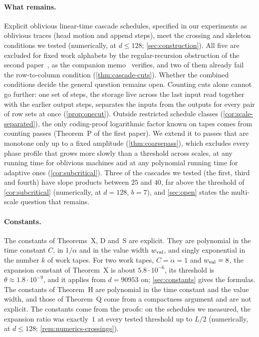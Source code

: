 \paragraph{What remains.} Explicit oblivious linear-time cascade schedules, specified in our experiments as oblivious traces (head motion
and append steps), meet the crossing and skeleton conditions we tested (numerically, at $d\le128$; \cref{sec:construction}). All five are
excluded for fixed work alphabets by the regular-recursion obstruction of the second paper~\cite[Theorem~7.5]{SecondPaper2026}, as the
companion memo~\cite[Theorem~1.1]{CascadeObstructionMemo2026} verifies, and two of them already fail the row-to-column condition
(\cref{thm:cascade-cuts}). Whether the combined conditions decide the general question remains open. Counting cuts alone cannot go further: one set of steps, the storage live across the last input read
together with the earlier output steps, separates the inputs from the outputs for every pair of row sets at once (\cref{prop:onecut}).
Outside restricted schedule classes (\cref{cor:scale-separated}), the only coding-proof logarithmic factor known on tapes comes from counting
passes (Theorem~P of the first paper). We extend it to passes that are monotone only up to a fixed amplitude (\cref{thm:coarsepass}), which
excludes every phase profile that grows more slowly than a threshold across scales, at any running time for oblivious machines and at any
polynomial running time for adaptive ones (\cref{cor:subcritical}). Three of the cascades we tested (the first, third and fourth) have slope
products between $25$ and $40$, far above the threshold of \cref{cor:subcritical} (numerically, at $d=128$, $b=7$), and
\cref{sec:open} states the multi-scale question that remains.

\paragraph{Constants.} The constants of Theorems~X, D and~S are explicit. They are polynomial in the time constant $C$, in
$1/\alpha$ and in the value width $w_{\mathrm{val}}$, and singly exponential in the number $k$ of work tapes. For two work tapes, $C=\alpha=1$ and
$w_{\mathrm{val}}=8$, the expansion constant of Theorem~X is about $5.8\cdot10^{-6}$, its threshold is $\theta\approx1.8\cdot10^{-9}$, and it
applies from $d=90953$ on; \cref{sec:constants} gives the formulas. The constants of Theorem~H are polynomial in the
time constant and the value width, and those of Theorem~Q come from a compactness argument and are not explicit. The constants
come from the proofs: on the schedules we measured, the expansion ratio was exactly~$1$ at every tested threshold up to $L/2$
(numerically, at $d\le128$; \cref{rem:numerics-crossings}).

